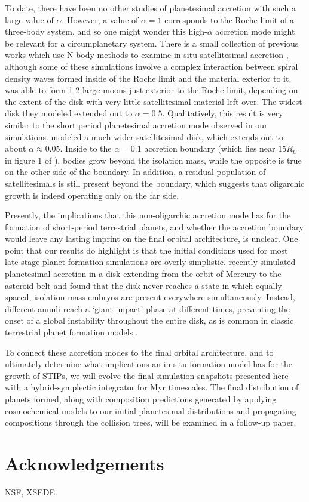 \documentclass[twocolumn]{aastex63}
\begin{document}
To date, there have been no other studies of planetesimal accretion
with such a large value of $\alpha$. However, a value of $\alpha = 1$
corresponds to the Roche limit of a three-body system, and so one
might wonder this high-$\alpha$ accretion mode might be relevant for a
circumplanetary system. There is a small collection of previous works
which use N-body methods to examine in-situ satellitesimal accretion
\citep{ida97, richardson00, kokubo00b, ida20}, although some of these simulations involve a complex interaction between spiral 
density waves formed inside of the Roche limit and the material exterior to it. \citet{ida97} was able to form 1-2
large moons just exterior to the Roche limit, depending on the extent of the disk with very little satellitesimal material left over. 
The widest disk they modeled extended out to $\alpha = 0.5$. Qualitatively, this result is very similar to the short period 
planetesimal accretion mode observed in our simulations. \citet{ida20} modeled a much wider satellitesimal disk, which extends 
out to about $\alpha \approx 0.05$. Inside to the $\alpha = 0.1$ accretion boundary (which lies near $15 R_{U}$ in figure 1 of 
\citet{ida20}), bodies grow beyond the isolation mass, while the opposite is true on the other side of the boundary. In addition, a 
residual population of satellitesimals is still present beyond the boundary, which suggests that oligarchic growth is indeed 
operating only on the far side.

Presently, the implications that this non-oligarchic accretion mode has for the formation of short-period terrestrial planets, and 
whether the accretion boundary would leave any lasting imprint on the final orbital architecture, is unclear. One point that our 
results do highlight is that the initial conditions used for most late-stage planet formation simulations are overly simplistic. 
\citet{clement20} recently simulated planetesimal accretion in a disk extending from the orbit of Mercury to the asteroid belt and 
found that the disk never reaches a state in which equally-spaced, isolation mass embryos are present everywhere 
simultaneously. Instead, different annuli reach a `giant impact' phase at different times, preventing the onset of a global instability 
throughout the entire disk, as is common in classic terrestrial planet formation models \citep{chambers01, raymond09}.

To connect these accretion modes to the final orbital architecture,
and to ultimately determine what implications an in-situ formation model has for the growth of STIPs, we will evolve the final 
simulation snapshots presented here with a hybrid-symplectic integrator for Myr timescales. The final distribution of planets 
formed, along with composition predictions generated by applying cosmochemical models to our initial planetesimal distributions 
and propagating compositions through the collision trees, will be examined in a follow-up paper.

\section{Acknowledgements}

NSF, XSEDE.



\clearpage
\end{document}
